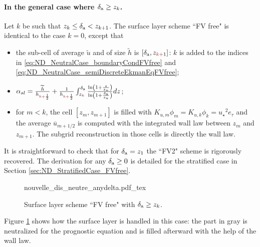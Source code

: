\paragraph{In the general case where $\delta_{\rm a} \geq z_k$.}
Let $k$ be such that $z_k \leq \delta_{\rm a} < z_{k+1}$.
The surface layer scheme ``FV free" is identical to the case $k=0$, except that
\begin{itemize}
	\item the sub-cell of average $\widetilde{u}$ and of size
		$\widetilde{h}$ is $[\delta_{\rm a}, z_{\emphase{k+}1}]$:
		$k$ is added to the indices in 
		\eqref{eq:ND_NeutralCase_boundaryCondFVfree} and
		\eqref{eq:ND_NeutralCase_semiDiscreteEkmanEqFVfree};
	\item $\alpha_{sl} = \frac{\widetilde{h}}
			{h_{\emphase{k+}\frac{1}{2}}} +
		\frac{1}{h_{\emphase{k+}\frac{1}{2}}}
		\int_{z_\emphase{k}}^{\delta_{\rm a}}
		\frac{\ln(1+\frac{z}{z_{u}})}
			{\ln(1+\frac{\delta_{\rm a}}{z_{u}})} dz$;
	\item for $m < k$, the cell $[z_m, z_{m+1}]$ is filled with
		$K_{u,m} \phi_m = K_{u,k}\phi_k =
	{u_\star}^2e_\tau$
		and the average $\overline{u}_{m+1/2}$
		is computed with the integrated wall law
		between $z_m$ and $z_{m+1}$.
		The subgrid reconstruction in those cells is directly
		the wall law.
\end{itemize}
It is straightforward to check that for $\delta_{\rm a} = z_1$
the ``FV2" scheme is rigorously recovered.
The derivation for any $\delta_{\rm a} \geq 0$ is detailed for
the stratified case in Section \ref{sec:ND_StratifiedCase_FVfree}.
\begin{figure}
	{nouvelle_dis_neutre_anydelta.pdf_tex}
	\caption{ Surface layer scheme ``FV free" with
	$\delta_{\rm a} \geq z_k$.}
	\label{fig:ND_NeutralCase_nouvelle_dis_neutre_anydelta}
\end{figure}
Figure \ref{fig:ND_NeutralCase_nouvelle_dis_neutre_anydelta}
shows how the surface layer is handled in this case: the part in gray
is neutralized for the prognostic equation and is filled afterward
with the help of the wall law.
